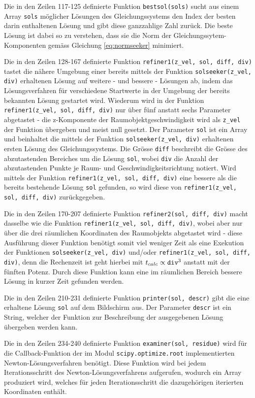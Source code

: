 \documentclass[a4paper,12pt]{article}
\numberwithin{equation}{section}
\begin{document}
Die in den Zeilen 117-125 definierte Funktion \verb|bestsol(sols)| sucht aus einem Array \verb|sols| möglicher Lösungen des Gleichungssystems den Index der besten darin enthaltenen Lösung und gibt diese ganzzahlige Zahl zurück. Die beste Lösung ist dabei so zu verstehen, dass sie die Norm der Gleichungssytem-Komponenten gemäss Gleichung \eqref{eq:normseeker} minimiert.

Die in den Zeilen 128-167 definierte Funktion \verb|refiner1(z_vel, sol, diff, div)| tastet die nähere Umgebung einer bereits mittels der Funktion \verb|solseeker(z_vel, div)| erhaltenen Lösung auf weitere - und bessere - Lösungen ab, indem das Lösungsverfahren für verschiedene Startwerte in der Umgebung der bereits bekannten Lösung gestartet wird. Wiederum wird in der Funktion \verb|refiner1(z_vel, sol, diff, div)| nur über fünf anstatt sechs Parameter abgetastet - die z-Komponente der Raumobjektgeschwindigkeit wird als \verb|z_vel| der Funktion übergeben und meist null gesetzt. Der Parameter \verb|sol| ist ein Array und beinhaltet die mittels der Funktion \verb|solseeker(z_vel, div)| erhaltenen ersten Lösung des Gleichungssystems. Die Grösse \verb|diff| beschreibt die Grösse des abzutastenden Bereiches um die Lösung \verb|sol|, wobei \verb|div| die Anzahl der abzutastenden Punkte je Raum- und Geschwindigkeitsrichtung notiert. Wird mittels der Funktion \verb|refiner1(z_vel, sol, diff, div)| eine bessere als die bereits bestehende Lösung \verb|sol| gefunden, so wird diese von \verb|refiner1(z_vel, sol, diff, div)| zurückgegeben.

Die in den Zeilen 170-207 definierte Funktion \verb|refiner2(sol, diff, div)| macht dasselbe wie die Funktion \verb|refiner1(z_vel, sol, diff, div)|, wobei aber nur über die drei räumlichen Koordinaten des Raumobjekts abgetastet wird - diese Ausführung dieser Funktion benötigt somit viel weniger Zeit als eine Exekution der Funktionen \verb|solseeker(z_vel, div)| und/oder \verb|refiner1(z_vel, sol, diff, div)|, denn die Rechenzeit ist geht hierbei mit $t_{calc} \propto \verb|div|^3$ anstatt mit der fünften Potenz. Durch diese Funktion kann eine im räumlichen Bereich bessere Lösung in kurzer Zeit gefunden werden.

Die in den Zeilen 210-231 definierte Funktion \verb|printer(sol, descr)| gibt die eine erhaltene Lösung \verb|sol| auf dem Bildschirm aus. Der Parameter \verb|descr| ist ein String, welcher der Funktion zur Beschreibung der ausgegebenen Lösung übergeben werden kann.

Die in den Zeilen 234-240 definierte Funktion \verb|examiner(sol, residue)| wird für die Callback-Funktion der im Modul \verb|scipy.optimize.root| implementierten Newton-Lösungsverfahren benötigt. Diese Funktion wird bei jedem Iterationsschritt des Newton-Lösungsverfahrens aufgerufen, wodurch ein Array produziert wird, welches für jeden Iterationsschritt die dazugehörigen iterierten Koordinaten enthält.
\end{document}
